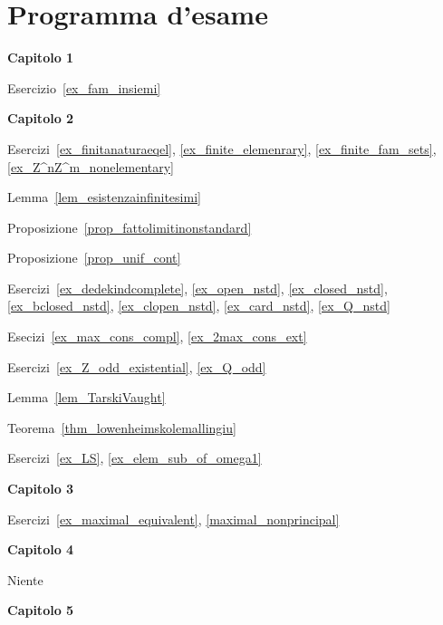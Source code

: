 \chapter*{Programma d'esame}\label{esame}

\textbf{Capitolo 1}

Esercizio~\ref{ex_fam_insiemi} 

\textbf{Capitolo 2}

Esercizi~\ref{ex_finitanaturaeqel}, \ref{ex_finite_elemenrary}, \ref{ex_finite_fam_sets}, \ref{ex_Z^nZ^m_nonelementary}

Lemma~\ref{lem_esistenzainfinitesimi}

Proposizione~\ref{prop_fattolimitinonstandard}

Proposizione~\ref{prop_unif_cont}

Esercizi~\ref{ex_dedekindcomplete}, \ref{ex_open_nstd}, \ref{ex_closed_nstd}, \ref{ex_bclosed_nstd}, \ref{ex_clopen_nstd}, \ref{ex_card_nstd}, \ref{ex_Q_nstd}

Esecizi~\ref{ex_max_cons_compl}, \ref{ex_2max_cons_ext}

Esercizi~\ref{ex_Z_odd_existential}, \ref{ex_Q_odd}

Lemma~\ref{lem_TarskiVaught}

Teorema~\ref{thm_lowenheimskolemallingiu}

Esercizi~\ref{ex_LS}, \ref{ex_elem_sub_of_omega1}

\textbf{Capitolo 3}

Esercizi~\ref{ex_maximal_equivalent}, \ref{maximal_nonprincipal}

\textbf{Capitolo 4}

Niente

\textbf{Capitolo 5}
